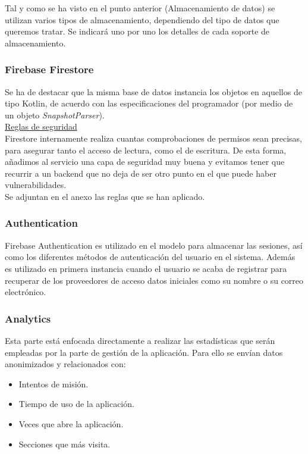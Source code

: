 \documentclass[twoside]{report}
\begin{document}
Tal y como se ha visto en el punto anterior (Almacenamiento de datos) se utilizan varios tipos de almacenamiento, dependiendo del tipo de datos que queremos tratar. Se indicará uno por uno los detalles de cada soporte de almacenamiento.

\subsubsection{Firebase Firestore}

Se ha de destacar que la misma base de datos instancia los objetos en aquellos de tipo Kotlin, de acuerdo con las especificaciones del programador (por medio de un objeto \textit{SnapshotParser}).\\

\underline{Reglas de seguridad}\\

Firestore internamente realiza cuantas comprobaciones de permisos sean precisas, para asegurar tanto el acceso de lectura, como el de escritura. De esta forma, añadimos al servicio una capa de seguridad muy buena y evitamos tener que recurrir a un backend que no deja de ser otro punto en el que puede haber vulnerabilidades.\\

Se adjuntan en el anexo las reglas que se han aplicado.\\

\subsubsection{Authentication}

Firebase Authentication es utilizado en el modelo para almacenar las sesiones, así como los diferentes métodos de autenticación del usuario en el sistema. Además es utilizado en primera instancia cuando el usuario se acaba de registrar para recuperar de los proveedores de acceso datos iniciales como su nombre o su correo electrónico.

\subsubsection{Analytics}

Esta parte está enfocada directamente a realizar las estadísticas que serán empleadas por la parte de gestión de la aplicación. Para ello se envían datos anonimizados y relacionados con:
\begin{itemize}
\item Intentos de misión.
\item Tiempo de uso de la aplicación.
\item Veces que abre la aplicación.
\item Secciones que más visita.
\end{itemize}
\end{document}
